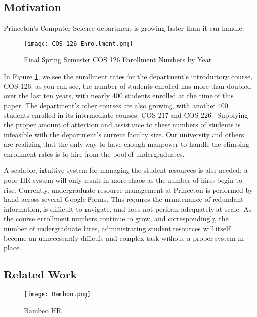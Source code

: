 \newpage
{}

\subsection{Motivation}

Princeton's Computer Science department is growing faster than it can handle:

\begin{figure}[!htbp]
    \centering
    \texttt{[image: COS-126-Enrollment.png]}
    \caption{Final Spring Semester COS 126 Enrollment Numbers by Year}
    \label{fig:enrollment}
\end{figure}

In Figure \ref{fig:enrollment}, we see the enrollment rates for the department's introductory course, COS 126: as you can see, the number of students enrolled has more than doubled over the last ten years, with nearly 400 students enrolled at the time of this paper. The department's other courses are also growing, with another 400 students enrolled in its intermediate courses: COS 217 and COS 226 \cite{registrar}. Supplying the proper amount of attention and assistance to these numbers of students is infeasible with the department's current faculty size. Our university and others are realizing that the only way to have enough manpower to handle the climbing enrollment rates is to hire from the pool of undergraduates.

A scalable, intuitive system for managing the student resources is also needed; a poor HR system will only result in more chaos as the number of hires begin to rise. Currently, undergraduate resource management at Princeton is performed by hand across several Google Forms. This requires the maintenance of redundant information, is difficult to navigate, and does not perform adequately at scale. As the course enrollment numbers continue to grow, and correspondingly, the number of undergraduate hires, administrating student resources will itself become an unnecessarily difficult and complex task without a proper system in place.

\subsection{Related Work}

\begin{wrapfigure}{r}{0.52\textwidth}
    \centering
    \texttt{[image: Bamboo.png]}
    \caption{Bamboo HR}
    \label{fig:bamboo}
\end{wrapfigure}

